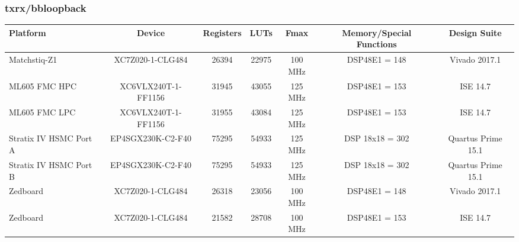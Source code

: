 \begin{scriptsize}
\subsubsection{txrx/bbloopback}
\begin{tabular}{|P{1.8cm}|c|c|c|c|c|c|}
\hline
{}
Platform               & Device              & Registers & LUTs  & Fmax    & Memory/Special Functions & Design Suite       \\
\hline
Matchstiq-Z1           & XC7Z020-1-CLG484    & 26394     & 22975 & 100 MHz & DSP48E1 = 148            & Vivado 2017.1      \\
\hline
ML605 FMC HPC          & XC6VLX240T-1-FF1156 & 31945     & 43055 & 125 MHz & DSP48E1 = 153            & ISE 14.7           \\
\hline
ML605 FMC LPC          & XC6VLX240T-1-FF1156 & 31955     & 43084 & 125 MHz & DSP48E1 = 153            & ISE 14.7           \\
\hline
Stratix IV HSMC Port A & EP4SGX230K-C2-F40   & 75295     & 54933 & 125 MHz & DSP 18x18 = 302          & Quartus Prime 15.1 \\
\hline
Stratix IV HSMC Port B & EP4SGX230K-C2-F40   & 75295     & 54933 & 125 MHz & DSP 18x18 = 302          & Quartus Prime 15.1 \\
\hline
Zedboard               & XC7Z020-1-CLG484    & 26318     & 23056 & 100 MHz & DSP48E1 = 148            & Vivado 2017.1      \\
\hline
Zedboard               & XC7Z020-1-CLG484    & 21582     & 28708 & 100 MHz & DSP48E1 = 153            & ISE 14.7	       \\
\hline
\end{tabular}
\end{scriptsize}
